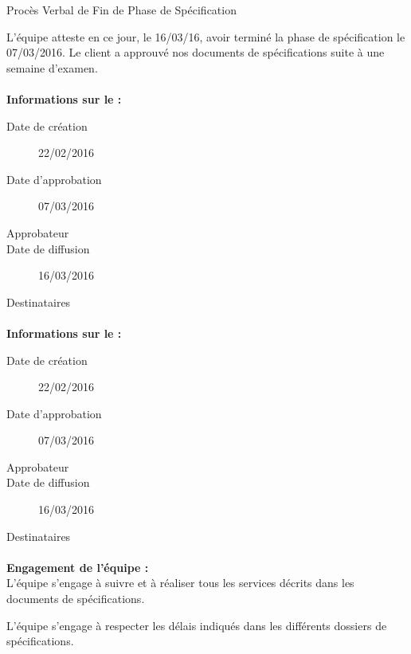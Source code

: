 \documentclass[asi, sansVersion]{picInsa}
\begin{document}
 
 \begin{center}
  \LARGE{}
    Procès Verbal de Fin de Phase de Spécification\\
 \end{center}
 
 \normalsize{}
 
L'équipe \nomEquipe{} atteste en ce jour, le 16/03/16, avoir terminé la phase de spécification le 07/03/2016.
Le client a approuvé nos documents de spécifications suite à une semaine d'examen.


\paragraph{}
\textbf{Informations sur le \DSECourt{} :}

\begin{description}
  \item[Date de création]22/02/2016
  \item[Date d'approbation]07/03/2016
  \item[Approbateur]\nomClient
  \item[Date de diffusion]16/03/2016
  \item[Destinataires]\nomEquipe
\end{description}

\paragraph{}
\textbf{Informations sur le \PTVCourt :}

\begin{description}
  \item[Date de création]22/02/2016
  \item[Date d'approbation]07/03/2016
  \item[Approbateur]\nomClient
  \item[Date de diffusion]16/03/2016
  \item[Destinataires]\nomEquipe
\end{description}

\paragraph{}
\textbf{Engagement de l'équipe :}\\


L'équipe \nomEquipe{} s'engage à suivre et à réaliser tous les services décrits dans les documents de spécifications.


L'équipe \nomEquipe{} s'engage à respecter les délais indiqués dans les différents dossiers de spécifications.
\end{document}
